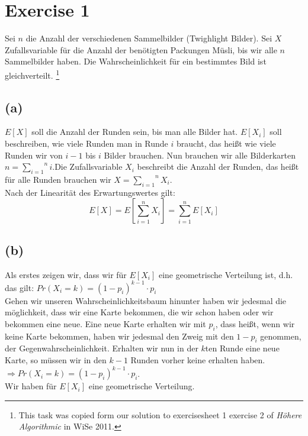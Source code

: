\section*{Exercise 1}

Sei $n$ die Anzahl der verschiedenen Sammelbilder (Twighlight Bilder). Sei $X$ Zufallsvariable für die Anzahl der benötigten Packungen Müsli, bis wir alle $n$ Sammelbilder haben. Die Wahrscheinlichkeit für ein bestimmtes Bild ist gleichverteilt.
\footnote{This task was copied form our solution to exercisesheet 1 exercise 2 of \emph{Höhere Algorithmic} in WiSe 2011.}


\subsection*{(a)}

$E[X]$ soll die Anzahl der Runden sein, bis man alle Bilder hat. $E[ X_i ]$ soll beschreiben, wie viele Runden man in Runde $i$ braucht, das heißt wie viele Runden wir von $i-1$ bis $i$ Bilder brauchen. Nun brauchen wir alle Bilderkarten $n = \overset{n}{\underset{i=1}{\sum}} i$.Die Zufallsvariable $X_i$ beschreibt die Anzahl der Runden, das heißt für alle Runden brauchen wir $X = \overset{n}{\underset{i=1}{\sum}} X_i$.\\
Nach der Linearität des Erwartungswertes gilt:\\
$$E[ X ] = E \left[ \sum_{i=1}^{n} X_i \right] = \sum_{i=1}^{n} E[ X_i ]$$




\subsection*{(b)}

Als erstes zeigen wir, dass wir für $E[X_i]$ eine geometrische Verteilung ist, d.h. das gilt:
$Pr(X_i = k) = (1 - p_i)^{k-1}\cdot p_i$ \\

Gehen wir unseren Wahrscheinlichkeitsbaum hinunter haben wir jedesmal die möglichkeit, dass wir eine Karte bekommen, die wir schon haben oder wir bekommen eine neue. Eine neue Karte erhalten wir mit $p_i$, dass heißt, wenn wir keine Karte bekommen, haben wir jedesmal den Zweig mit den $1-p_i$ genommen, der Gegenwahrscheinlichkeit. Erhalten wir nun in der $k$ten Runde eine neue Karte, so müssen wir in den $k-1$ Runden vorher keine erhalten haben. $\Rightarrow Pr(X_i = k) = (1-p_i)^{k-1} \cdot p_i$.\\
Wir haben für $E[X_i]$ eine geometrische Verteilung.

